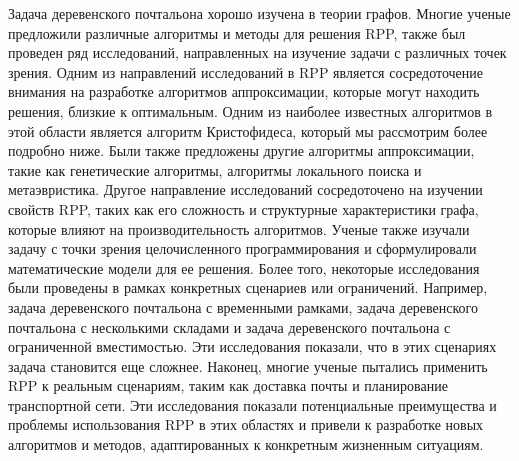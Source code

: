Задача деревенского почтальона хорошо изучена в теории графов. Многие ученые предложили различные алгоритмы и методы для решения RPP, также был проведен ряд исследований, направленных на изучение задачи с различных точек зрения.
\newline
\newline
Одним из направлений исследований в RPP является сосредоточение внимания на разработке алгоритмов аппроксимации, которые могут находить решения, близкие к оптимальным. Одним из наиболее известных алгоритмов в этой области является алгоритм Кристофидеса, который мы рассмотрим более подробно ниже. Были также предложены другие алгоритмы аппроксимации, такие как генетические алгоритмы, алгоритмы локального поиска и метаэвристика.
\newline
\newline
Другое направление исследований сосредоточено на изучении свойств RPP, таких как его сложность и структурные характеристики графа, которые влияют на производительность алгоритмов. Ученые также изучали задачу с точки зрения целочисленного программирования и сформулировали математические модели для ее решения.
\newline
\newline
Более того, некоторые исследования были проведены в рамках конкретных сценариев или ограничений. Например, задача деревенского почтальона с временными рамками, задача деревенского почтальона с несколькими складами и задача деревенского почтальона с ограниченной вместимостью. Эти исследования показали, что в этих сценариях задача становится еще сложнее.
\newline
\newline
Наконец, многие ученые пытались применить RPP к реальным сценариям, таким как доставка почты и планирование транспортной сети. Эти исследования показали потенциальные преимущества и проблемы использования RPP в этих областях и привели к разработке новых алгоритмов и методов, адаптированных к конкретным жизненным ситуациям.